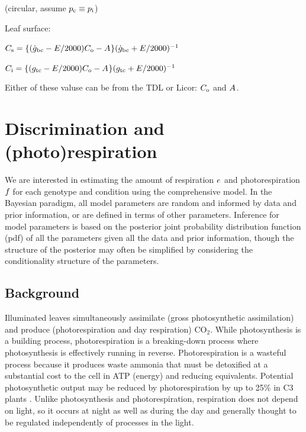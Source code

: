 (circular, assume $p_{\textrm{c}}\equiv p_{\textrm{i}}$)






\noindent
Leaf surface:

$C_{\textrm{s}} = \{ (\dot{g}_{\textrm{bc}} - E_{}/2000)C_{\textrm{o}} - A_{} \} ( \dot{g}_{\textrm{bc}} + E_{}/2000 )^{-1}$

$C_{\textrm{i}} = \{ (g_{\textrm{tc}} - E_{}/2000)C_{\textrm{o}} - A_{} \} ( g_{\textrm{tc}} + E_{}/2000 )^{-1}$

Either of these valuse can be from the TDL or Licor: $C_{\textrm{o}}$ and $A_{}$.



\section{Discrimination and (photo)respiration}

We are interested in estimating the
  amount of respiration $e_{}$ and photorespiration $f_{}$
  for each genotype and condition
  using the comprehensive model.
In the Bayesian paradigm, all model parameters are random
  and informed by data and prior information,
  or are defined in terms of other parameters.
Inference for model parameters is based on the posterior joint probability distribution function (pdf)
  of all the parameters given all the data and prior information,
  though the structure of the posterior may often be simplified
  by considering the conditionality structure of the parameters.

\subsection{Background}

Illuminated leaves simultaneously assimilate (gross photosynthetic assimilation)
  and produce (photorespiration and day respiration) CO$_2$.
While photosynthesis is a building process,
  photorespiration
  is a breaking-down process where photosynthesis is effectively running in reverse.
Photorespiration is a wasteful process because it
  produces waste ammonia that must be detoxified at a substantial cost
  to the cell in ATP (energy) and reducing equivalents.
Potential photosynthetic output may be reduced by photorespiration by up to 25\%
  in C3 plants \citep{sharkey1988estimating}.
Unlike photosynthesis and photorespiration, respiration does not depend on
  light, so it occurs at night as well as during the day and generally thought to
  be regulated independently of processes in the light.


